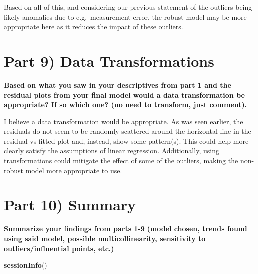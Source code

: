 \documentclass[
]{article}
\newenvironment{Shaded}{\begin{snugshade}}{\end{snugshade}}
\newcommand{\FunctionTok}[1]{\textcolor[rgb]{0.13,0.29,0.53}{\textbf{#1}}}
\newcommand{\NormalTok}[1]{#1}
\begin{document}
Based on all of this, and considering our previous statement of the
outliers being likely anomalies due to e.g.~measurement error, the
robust model may be more appropriate here as it reduces the impact of
these outliers.

\section{Part 9) Data
Transformations}\label{part-9-data-transformations}

\textbf{Based on what you saw in your descriptives from part 1 and the
residual plots from your final model would a data transformation be
appropriate? If so which one? (no need to transform, just comment).}

I believe a data transformation would be appropriate. As was seen
earlier, the residuals do not seem to be randomly scattered around the
horizontal line in the residual vs fitted plot and, instead, show some
pattern(s). This could help more clearly satisfy the assumptions of
linear regression. Additionally, using transformations could mitigate
the effect of some of the outliers, making the non-robust model more
appropriate to use.

\section{Part 10) Summary}\label{part-10-summary}

\textbf{Summarize your findings from parts 1-9} \textbf{(model chosen,
trends found using said model, possible multicollinearity, sensitivity
to outliers/influential points, etc.)}

\begin{Shaded}
\begin{Highlighting}[]
\FunctionTok{sessionInfo}\NormalTok{()}
\end{Highlighting}
\end{Shaded}
\end{document}
